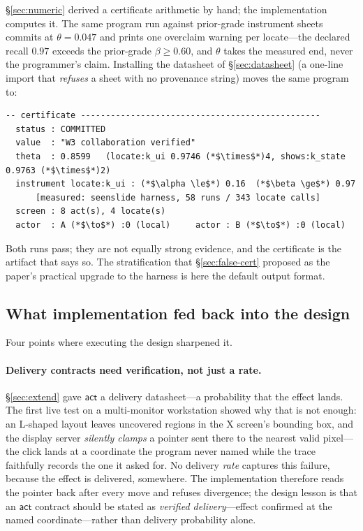 \documentclass[acmsmall,screen,nonacm]{acmart}
\newcommand{\actc}{\mathsf{act}}
\newcommand{\conf}{\theta}
\theoremstyle{acmdefinition}%
\theoremstyle{acmplain}%
\begin{document}
\S\ref{sec:numeric} derived a certificate arithmetic by hand; the
implementation computes it. The same program run against prior-grade
instrument sheets commits at $\conf = 0.047$ and prints one overclaim
warning per locate---the declared recall $0.97$ exceeds the prior-grade
$\beta \ge 0.60$, and $\conf$ takes the measured end, never the
programmer's claim. Installing the datasheet of \S\ref{sec:datasheet}
(a one-line import that \emph{refuses} a sheet with no provenance
string) moves the same program to:

\begin{lstlisting}
-- certificate ------------------------------------------------
  status : COMMITTED
  value  : "W3 collaboration verified"
  theta  : 0.8599   (locate:k_ui 0.9746 (*$\times$*)4, shows:k_state 0.9763 (*$\times$*)2)
  instrument locate:k_ui : (*$\alpha \le$*) 0.16  (*$\beta \ge$*) 0.97
      [measured: seenslide harness, 58 runs / 343 locate calls]
  screen : 8 act(s), 4 locate(s)
  actor  : A (*$\to$*) :0 (local)     actor : B (*$\to$*) :0 (local)
\end{lstlisting}

Both runs pass; they are not equally strong evidence, and the
certificate is the artifact that says so. The stratification that
\S\ref{sec:false-cert} proposed as the paper's practical upgrade to the
harness is here the default output format.

\subsection{What implementation fed back into the design}
\label{sec:feedback}

Four points where executing the design sharpened it.

\paragraph{Delivery contracts need verification, not just a rate.}
\S\ref{sec:extend} gave $\actc$ a delivery datasheet---a probability
that the effect lands. The first live test on a multi-monitor
workstation showed why that is not enough: an L-shaped layout leaves
uncovered regions in the X screen's bounding box, and the display server
\emph{silently clamps} a pointer sent there to the nearest valid
pixel---the click lands at a coordinate the program never named while
the trace faithfully records the one it asked for. No delivery
\emph{rate} captures this failure, because the effect is delivered,
somewhere. The implementation therefore reads the pointer back after
every move and refuses divergence; the design lesson is that an $\actc$
contract should be stated as \emph{verified delivery}---effect confirmed
at the named coordinate---rather than delivery probability alone.
\end{document}
